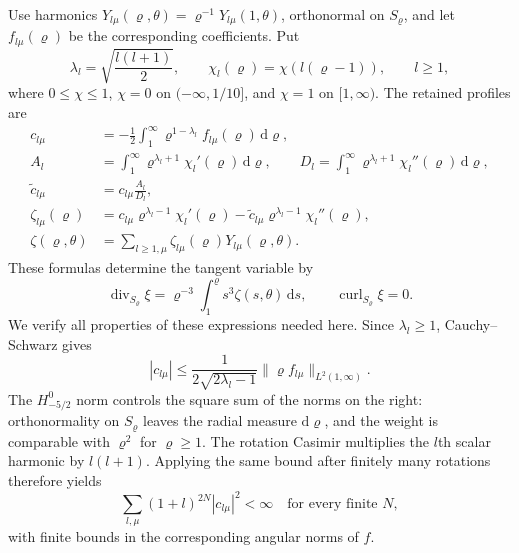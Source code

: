 \documentclass[
  english,
  11pt,
  reqno]{amsart}
\begin{document}
Use harmonics
\(Y_{l\mu}(\varrho,\theta)=\varrho^{-1}Y_{l\mu}(1,\theta)\), orthonormal
on \(S_\varrho\), and let \(f_{l\mu}(\varrho)\) be the corresponding
coefficients. Put \[
\lambda_l=\sqrt{\frac{l(l+1)}2},
\qquad \chi_l(\varrho)=\chi(l(\varrho-1)),
\qquad l\ge1,
\] where \(0\le\chi\le1\), \(\chi=0\) on \((-\infty,1/10]\), and
\(\chi=1\) on \([1,\infty)\). The retained profiles are%
 \[
\begin{aligned}
c_{l\mu}
&=-\frac12\int_1^\infty
\varrho^{1-\lambda_l}f_{l\mu}(\varrho)\,\mathrm d\varrho,\\
A_l&=\int_1^\infty
\varrho^{\lambda_l+1}\chi_l'(\varrho)\,\mathrm d\varrho,
\qquad
D_l=\int_1^\infty
\varrho^{\lambda_l+1}\chi_l''(\varrho)\,\mathrm d\varrho,\\
\widetilde c_{l\mu}&=c_{l\mu}\frac{A_l}{D_l},\\
\zeta_{l\mu}(\varrho)
&=c_{l\mu}\varrho^{\lambda_l-1}\chi_l'(\varrho)
-\widetilde c_{l\mu}\varrho^{\lambda_l-1}\chi_l''(\varrho),\\
\zeta(\varrho,\theta)
&=\sum_{l\ge1,\mu}
\zeta_{l\mu}(\varrho)Y_{l\mu}(\varrho,\theta).
\end{aligned}
\] These formulas determine the tangent variable by%
\[
\operatorname{div}_{S_\varrho}\xi
=\varrho^{-3}\int_1^\varrho s^3\zeta(s,\theta)\,\mathrm ds,
\qquad
\operatorname{curl}_{S_\varrho}\xi=0.
\] We verify all properties of these expressions needed here. Since
\(\lambda_l\ge1\), Cauchy--Schwarz gives%
 \[
|c_{l\mu}|\le
\frac{1}{2\sqrt{2\lambda_l-1}}
\|\varrho f_{l\mu}\|_{L^2(1,\infty)}.
\] The \(H^0_{-5/2}\) norm controls the square sum of the norms on the
right: orthonormality on \(S_\varrho\) leaves the radial measure
\(\mathrm d\varrho\), and the weight is comparable with \(\varrho^2\)
for \(\varrho\ge1\). The rotation Casimir multiplies the \(l\)th scalar
harmonic by \(l(l+1)\). Applying the same bound after finitely many
rotations therefore yields%
 \[
\sum_{l,\mu}(1+l)^{2N}|c_{l\mu}|^2<\infty
\quad\text{for every finite }N,
\] with finite bounds in the corresponding angular norms of \(f\).
\end{document}
